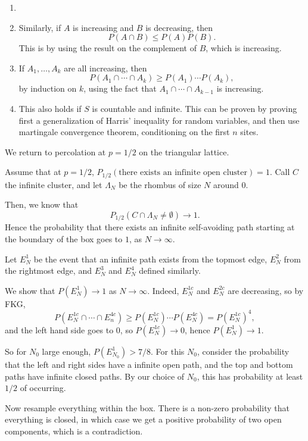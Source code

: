\documentclass[12pt]{article}
\begin{document}
\begin{remark}
	\begin{enumerate}
		\item[]
		\item Similarly, if $A$ is increasing and $B$ is decreasing, then
			\[
			P(A \cap B) \leq P(A) P(B).
			\]
			This is by using the result on the complement of $B$, which is increasing.
		\item If $A_1, \ldots, A_k$ are all increasing, then
			\[
			P(A_1 \cap \cdots \cap A_k) \geq P(A_1) \cdots P(A_k),
			\]
			by induction on $k$, using the fact that $A_1 \cap \cdots \cap A_{k-1}$ is increasing.
		\item This also holds if $S$ is countable and infinite. This can be proven by proving first a generalization of Harris' inequality for random variables, and then use martingale convergence theorem, conditioning on the first $n$ sites.
	\end{enumerate}
\end{remark}

We return to percolation at $p = 1/2$ on the triangular lattice.

\begin{proofbox}
	Assume that at $p = 1/2$, $P_{1/2}(\text{there exists an infinite open cluster}) = 1$. Call $C$ the infinite cluster, and let $\Lambda_N$ be the rhombus of size $N$ around $0$.

	Then, we know that
	\[
	P_{1/2}(C \cap \Lambda_N \neq \emptyset) \to 1.
	\]
	Hence the probability that there exists an infinite self-avoiding path starting at the boundary of the box goes to $1$, as $N \to \infty$.

	Let $E_N^1$ be the event that an infinite path exists from the topmost edge, $E_N^2$ from the rightmost edge, and $E_N^3$ and $E_N^4$ defined similarly.

	We show that $P(E_N^1) \to 1$ as $N \to \infty$. Indeed, $E_N^{1c}$ and $E_N^{2c}$ are decreasing, so by FKG,
	\[
	P(E_N^{1c} \cap \cdots \cap E_n^{4c}) \geq P(E_N^{1c}) \cdots P(E_N^{4c}) = P(E_N^{1c})^{4},
	\]
	and the left hand side goes to $0$, so $P(E_N^{1c}) \to 0$, hence $P(E_N^1) \to 1$.

	So for $N_0$ large enough, $P(E_{N_0}^1) > 7/8$. For this $N_0$, consider the probability that the left and right sides have a infinite open path, and the top and bottom paths have infinite closed paths. By our choice of $N_0$, this has probability at least $1/2$ of occurring.

	Now resample everything within the box. There is a non-zero probability that everything is closed, in which case we get a positive probability of two open components, which is a contradiction.
\end{proofbox}
\end{document}
